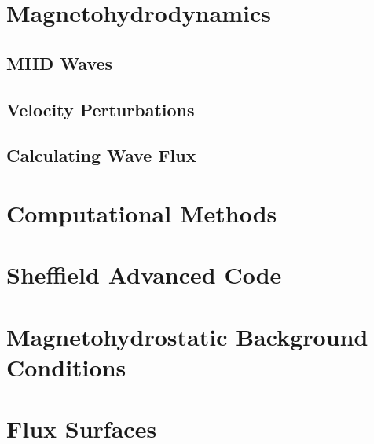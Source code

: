 \section{Magnetohydrodynamics}\label{sec:MHD}

\subsection{MHD Waves}\label{sec:MHDwaves}

\subsection{Velocity Perturbations}\label{sec:Vpert}

\subsection{Calculating Wave Flux}\label{sec:waveflux}

\section{Computational Methods}\label{sec:numericalmethods}

\section{Sheffield Advanced Code}\label{sec:SAC}

\section{Magnetohydrostatic Background Conditions}\label{sec:mhsbackground}

\section{Flux Surfaces}\label{sec:fluxsurfaces}

